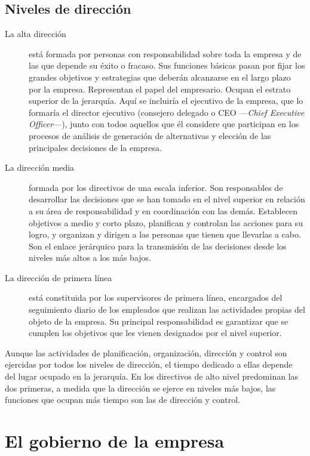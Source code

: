 \documentclass[12pt,a4paper,spanish]{report}
\begin{document}
		\subsection{\textcolor[rgb]{0.9,0.3,0.3}Niveles de dirección}
			\begin{description}
				\item[La alta dirección] está formada por personas con responsabilidad sobre toda la empresa y de las que depende su éxito o fracaso. Sus funciones básicas pasan por fijar los grandes objetivos y estrategias que deberán alcanzarse en el largo plazo por la empresa. Representan el papel del empresario. Ocupan el estrato superior de la jerarquía. Aquí se incluiría el ejecutivo de la empresa, que lo formaría el director ejecutivo (consejero delegado o CEO ---\textcolor[rgb]{0.9,0.3,0.3}{\emph{Chief Executive Officer}}---), junto con todos aquellos que él considere que participan en los procesos de análisis de generación de alternativas y elección de las principales decisiones de la empresa.

				\item[La dirección media] formada por los directivos de una escala inferior. Son responsables de desarrollar las decisiones que se han tomado en el nivel superior en relación a su área de responsabilidad y en coordinación con las demás. Establecen objetivos a medio y corto plazo, planifican y controlan las acciones para su logro, y organizan y dirigen a las personas que tienen que llevarlas a cabo. Son el enlace jerárquico para la transmisión de las decisiones desde los niveles más altos a los más bajos.

				\item[La dirección de primera línea] está constituida por los supervisores de primera línea, encargados del seguimiento diario de los empleados que realizan las actividades propias del objeto de la empresa. Su principal responsabilidad es garantizar que se cumplen los objetivos que les vienen designados por el nivel superior.
			\end{description}

			Aunque las actividades de planificación, organización, dirección y control son ejercidas por todos los niveles de dirección, el tiempo dedicado a ellas depende del lugar ocupado en la jerarquía. En los directivos de alto nivel predominan las dos primeras, a medida que la dirección se ejerce en niveles más bajos, las funciones que ocupan más tiempo son las de dirección y control.
	
	\section{\textcolor[rgb]{0.9,0.3,0.3}El gobierno de la empresa}
\end{document}
